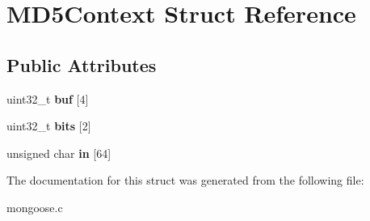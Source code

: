 \hypertarget{struct_m_d5_context}{\section{M\-D5\-Context Struct Reference}
\label{struct_m_d5_context}
}
\subsection*{Public Attributes}
\begin{DoxyCompactItemize}
\item 
\hypertarget{struct_m_d5_context_a6129b10b90387e1cb1d4cd92e4605c33}{uint32\-\_\-t {\bfseries buf} \mbox{[}4\mbox{]}}\label{struct_m_d5_context_a6129b10b90387e1cb1d4cd92e4605c33}

\item 
\hypertarget{struct_m_d5_context_a48f837fb64afd013f832e3cdab68e5de}{uint32\-\_\-t {\bfseries bits} \mbox{[}2\mbox{]}}\label{struct_m_d5_context_a48f837fb64afd013f832e3cdab68e5de}

\item 
\hypertarget{struct_m_d5_context_ae8be45f236e5cb12b0ae79da77e5f929}{unsigned char {\bfseries in} \mbox{[}64\mbox{]}}\label{struct_m_d5_context_ae8be45f236e5cb12b0ae79da77e5f929}

\end{DoxyCompactItemize}


The documentation for this struct was generated from the following file\-:\begin{DoxyCompactItemize}
\item 
mongoose.\-c\end{DoxyCompactItemize}
